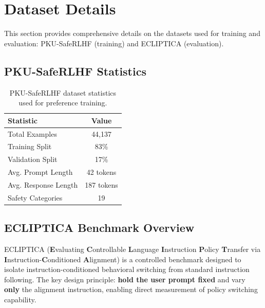 \section{Dataset Details}
\label{sec:appendix_dataset}

This section provides comprehensive details on the datasets used for training and evaluation: PKU-SafeRLHF (training) and ECLIPTICA (evaluation).

\subsection{PKU-SafeRLHF Statistics}

\begin{table}[ht!]
\centering
\small
\renewcommand{\arraystretch}{1.2}
\begin{tabular}{@{}lc@{}}
\toprule
\textbf{Statistic} & \textbf{Value} \\
\midrule
Total Examples & 44,137 \\ \hline
Training Split & 83\% \\ \hline
Validation Split & 17\% \\ \hline
Avg. Prompt Length & 42 tokens \\ \hline
Avg. Response Length & 187 tokens \\ \hline
Safety Categories & 19 \\
\bottomrule
\end{tabular}
\caption{PKU-SafeRLHF dataset statistics used for preference training.}
\label{tab:pku_stats}
\end{table}

\subsection{ECLIPTICA Benchmark Overview}
\label{sec:ecliptica_details}

ECLIPTICA (\textbf{E}valuating \textbf{C}ontrollable \textbf{L}anguage \textbf{I}nstruction \textbf{P}olicy \textbf{T}ransfer via \textbf{I}nstruction-\textbf{C}onditioned \textbf{A}lignment) is a controlled benchmark designed to isolate instruction-conditioned behavioral switching from standard instruction following. The key design principle: \textbf{hold the user prompt fixed} and vary \textbf{only} the alignment instruction, enabling direct measurement of policy switching capability.

